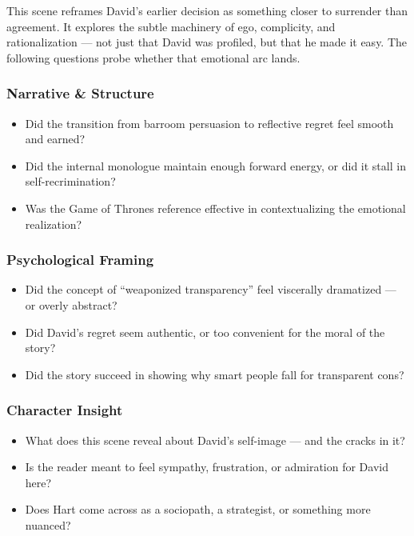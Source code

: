 This scene reframes David’s earlier decision as something closer to surrender than agreement. It explores the subtle machinery of ego, complicity, and rationalization — not just that David was profiled, but that he made it easy. The following questions probe whether that emotional arc lands.

\subsubsection*{Narrative \& Structure}

\begin{itemize}
  \item Did the transition from barroom persuasion to reflective regret feel smooth and earned?
  \item Did the internal monologue maintain enough forward energy, or did it stall in self-recrimination?
  \item Was the Game of Thrones reference effective in contextualizing the emotional realization?
\end{itemize}

\subsubsection*{Psychological Framing}

\begin{itemize}
  \item Did the concept of ``weaponized transparency'' feel viscerally dramatized — or overly abstract?
  \item Did David’s regret seem authentic, or too convenient for the moral of the story?
  \item Did the story succeed in showing why smart people fall for transparent cons?
\end{itemize}

\subsubsection*{Character Insight}

\begin{itemize}
  \item What does this scene reveal about David’s self-image — and the cracks in it?
  \item Is the reader meant to feel sympathy, frustration, or admiration for David here?
  \item Does Hart come across as a sociopath, a strategist, or something more nuanced?
\end{itemize}

